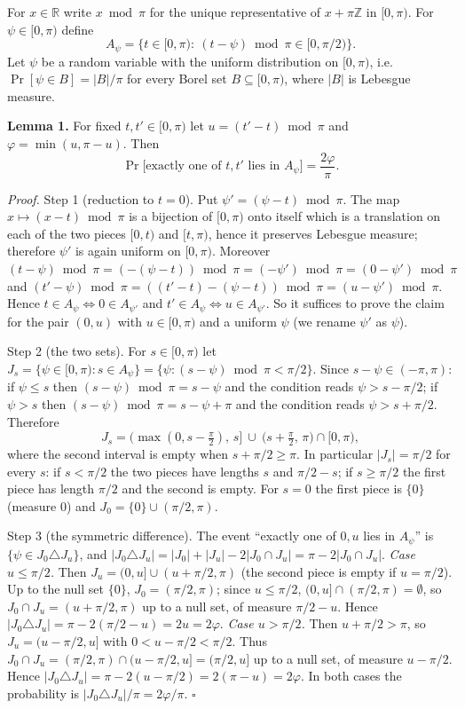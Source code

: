 \documentclass[11pt,a4paper]{article}
\begin{document}
For \(x\in\mathbb R\) write \(x\bmod\pi\) for the unique representative
of \(x+\pi\mathbb Z\) in \([0,\pi)\). For \(\psi\in[0,\pi)\) define
\[A_\psi=\{t\in[0,\pi):\ (t-\psi)\bmod\pi\in[0,\pi/2)\}.\] Let \(\psi\)
be a random variable with the uniform distribution on \([0,\pi)\),
i.e.~\(\Pr[\psi\in B]=|B|/\pi\) for every Borel set
\(B\subseteq[0,\pi)\), where \(|B|\) is Lebesgue measure.

\textbf{Lemma 1.} For fixed \(t,t'\in[0,\pi)\) let \(u=(t'-t)\bmod\pi\)
and \(\varphi=\min(u,\pi-u)\). Then
\[\Pr\big[\text{exactly one of } t,t' \text{ lies in } A_\psi\big]=\frac{2\varphi}{\pi}.\]

\emph{Proof.} Step 1 (reduction to \(t=0\)). Put
\(\psi'=(\psi-t)\bmod\pi\). The map \(x\mapsto(x-t)\bmod\pi\) is a
bijection of \([0,\pi)\) onto itself which is a translation on each of
the two pieces \([0,t)\) and \([t,\pi)\), hence it preserves Lebesgue
measure; therefore \(\psi'\) is again uniform on \([0,\pi)\). Moreover
\((t-\psi)\bmod\pi=(-(\psi-t))\bmod\pi=(-\psi')\bmod\pi=(0-\psi')\bmod\pi\)
and \((t'-\psi)\bmod\pi=((t'-t)-(\psi-t))\bmod\pi=(u-\psi')\bmod\pi\).
Hence \(t\in A_\psi\iff 0\in A_{\psi'}\) and
\(t'\in A_\psi\iff u\in A_{\psi'}\). So it suffices to prove the claim
for the pair \((0,u)\) with \(u\in[0,\pi)\) and a uniform \(\psi\) (we
rename \(\psi'\) as \(\psi\)).

Step 2 (the two sets). For \(s\in[0,\pi)\) let
\(J_s=\{\psi\in[0,\pi): s\in A_\psi\}=\{\psi: (s-\psi)\bmod\pi<\pi/2\}\).
Since \(s-\psi\in(-\pi,\pi)\): if \(\psi\le s\) then
\((s-\psi)\bmod\pi=s-\psi\) and the condition reads \(\psi>s-\pi/2\); if
\(\psi>s\) then \((s-\psi)\bmod\pi=s-\psi+\pi\) and the condition reads
\(\psi>s+\pi/2\). Therefore
\[J_s=\big(\max(0,s-\tfrac{\pi}{2}),\,s\big]\ \cup\ \big(s+\tfrac{\pi}{2},\,\pi\big)\cap[0,\pi),\]
where the second interval is empty when \(s+\pi/2\ge\pi\). In particular
\(|J_s|=\pi/2\) for every \(s\): if \(s<\pi/2\) the two pieces have
lengths \(s\) and \(\pi/2-s\); if \(s\ge\pi/2\) the first piece has
length \(\pi/2\) and the second is empty. For \(s=0\) the first piece is
\(\{0\}\) (measure \(0\)) and \(J_0=\{0\}\cup(\pi/2,\pi)\).

Step 3 (the symmetric difference). The event ``exactly one of \(0,u\)
lies in \(A_\psi\)'' is \(\{\psi\in J_0\triangle J_u\}\), and
\(|J_0\triangle J_u|=|J_0|+|J_u|-2|J_0\cap J_u|=\pi-2|J_0\cap J_u|\).
\emph{Case \(u\le\pi/2\).} Then \(J_u=(0,u]\cup(u+\pi/2,\pi)\) (the
second piece is empty if \(u=\pi/2\)). Up to the null set \(\{0\}\),
\(J_0=(\pi/2,\pi)\); since \(u\le\pi/2\),
\((0,u]\cap(\pi/2,\pi)=\emptyset\), so \(J_0\cap J_u=(u+\pi/2,\pi)\) up
to a null set, of measure \(\pi/2-u\). Hence
\(|J_0\triangle J_u|=\pi-2(\pi/2-u)=2u=2\varphi\). \emph{Case
\(u>\pi/2\).} Then \(u+\pi/2>\pi\), so \(J_u=(u-\pi/2,u]\) with
\(0<u-\pi/2<\pi/2\). Thus
\(J_0\cap J_u=(\pi/2,\pi)\cap(u-\pi/2,u]=(\pi/2,u]\) up to a null set,
of measure \(u-\pi/2\). Hence
\(|J_0\triangle J_u|=\pi-2(u-\pi/2)=2(\pi-u)=2\varphi\). In both cases
the probability is \(|J_0\triangle J_u|/\pi=2\varphi/\pi\). \(\square\)
\end{document}
